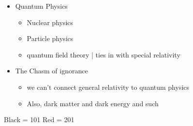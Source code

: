 \documentclass[letterpaper]{article}
\begin{document}
\begin{itemize}
\item Quantum Physics

\begin{itemize}
\item Nuclear physics
\item Particle physics
\item quantum field theory | ties in with special relativity
\end{itemize}

\item The Chasm of ignorance

\begin{itemize}
\item we can't connect general relativity to quantum physics
\item Also, dark matter and dark energy and such
\end{itemize}
\end{itemize}

Black = 101 Red = 201
\end{document}
